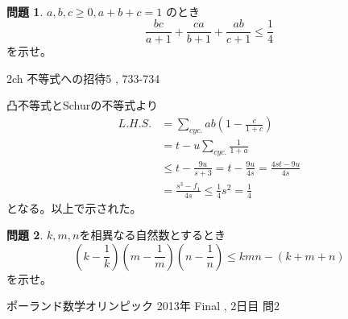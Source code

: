\documentclass[uplatex, a5paper]{jsarticle}
\makeatletter
\theoremstyle{definition}
\newtheorem{prob}{問題}
\renewenvironment{proof}[1][\proofname]{
  \pushQED{\qed}%
  \normalfont \topsep6\p@\@plus6\p@\relax
  \trivlist
  \item[\hskip\labelsep
    #1\@addpunct{\textbf{.}}]\ignorespaces
}{%
  \popQED\endtrivlist\@endpefalse
}
\providecommand{\proofname}{証明}
\newcommand{\lhs }{ L.H.S. }
\def\qed{\hfill $\Box$}
\makeatother
\begin{document}
\




\newpage

\begin{prob}
  \(a , b , c \geq 0 , a+b+c = 1\)
  のとき
  \[
  \frac{bc}{a+1} + \frac{ca}{b+1} + \frac{ab}{c+1} \leq \frac{1}{4}
  \]
  を示せ。
  \begin{flushright}
    2ch 不等式への招待5 , 733-734
  \end{flushright}
\end{prob}


\begin{proof}
  凸不等式とSchurの不等式より
  \begin{align*}
    \lhs &= \sum_{cyc.} ab\left( 1- \frac{c}{1+c} \right) \\
    &= t-u\sum_{cyc.} \frac{1}{1+a} \\
    &\leq t-\frac{9u}{s+3} = t- \frac{9u}{4s} = \frac{4st-9u}{4s} \\
    &= \frac{s^3-f_1}{4s} \leq \frac{1}{4}s^2 = \frac{1}{4}
  \end{align*}
  となる。以上で示された。
\end{proof}










\newpage

\begin{prob}
  \(k,m,n\)を相異なる自然数とするとき
  \[
  \left( k-\frac{1}{k} \right) \left( m-\frac{1}{m} \right) \left( n-\frac{1}{n} \right)
  \leq kmn-(k+m+n)
  \]
  を示せ。
  \begin{flushright}
    ポーランド数学オリンピック 2013年 Final , 2日目 問2
  \end{flushright}
\end{prob}
\end{document}
